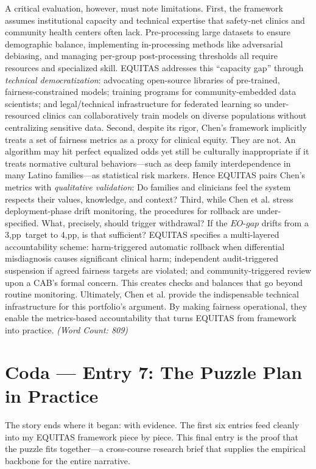 \documentclass[11pt,twoside]{article}
\DeclareRobustCommand{\EOgap}{EO\text{-}gap\xspace}
\DeclareRobustCommand{\pp}{pp\xspace} %
\begin{document}
A critical evaluation, however, must note limitations. First, the framework assumes institutional capacity and technical expertise that safety-net clinics and community health centers often lack. Pre-processing large datasets to ensure demographic balance, implementing in-processing methods like adversarial debiasing, and managing per-group post-processing thresholds all require resources and specialized skill. \textsc{EQUITAS} addresses this “capacity gap” through \textit{technical democratization}: advocating open-source libraries of pre-trained, fairness-constrained models; training programs for community-embedded data scientists; and legal/technical infrastructure for federated learning so under-resourced clinics can collaboratively train models on diverse populations without centralizing sensitive data. Second, despite its rigor, Chen’s framework implicitly treats a set of fairness metrics as a proxy for clinical equity. They are not. An algorithm may hit perfect equalized odds yet still be culturally inappropriate if it treats normative cultural behaviors—such as deep family interdependence in many Latino families—as statistical risk markers. Hence \textsc{EQUITAS} pairs Chen’s metrics with \textit{qualitative validation}: Do families and clinicians feel the system respects their values, knowledge, and context? Third, while Chen et al. stress deployment-phase drift monitoring, the procedures for rollback are under-specified. What, precisely, should trigger withdrawal? If the $\EOgap$ drifts from a 3,\pp\ target to 4,\pp, is that sufficient? \textsc{EQUITAS} specifies a multi-layered accountability scheme: harm-triggered automatic rollback when differential misdiagnosis causes significant clinical harm; independent audit-triggered suspension if agreed fairness targets are violated; and community-triggered review upon a CAB’s formal concern. This creates checks and balances that go beyond routine monitoring. Ultimately, Chen et al. provide the indispensable technical infrastructure for this portfolio’s argument. By making fairness operational, they enable the metrics-based accountability that turns \textsc{EQUITAS} from framework into practice. \textit{(Word Count: 809)}


\newpage
\section*{Coda --- Entry 7: The Puzzle Plan in Practice}

{
\vspace{-0.3cm}
The story ends where it began: with evidence. The first six entries feed cleanly into my \textsc{EQUITAS} framework piece by piece. This final entry is the proof that the puzzle fits together---a cross-course research brief that supplies the empirical backbone for the entire narrative.
}
\end{document}
